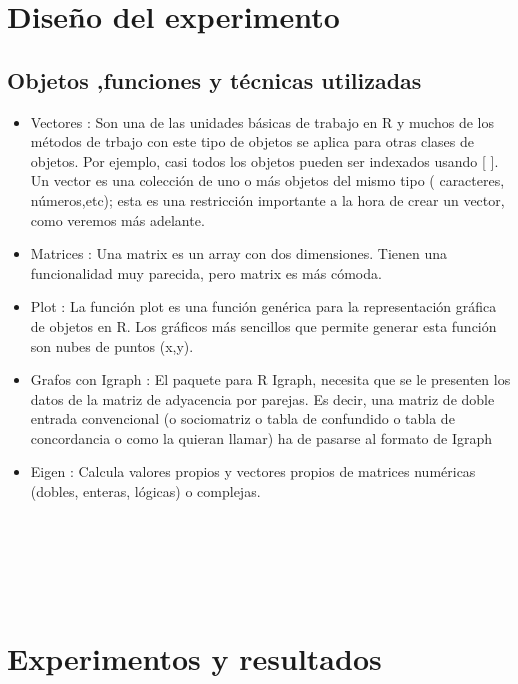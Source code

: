 \documentclass[twocolumn]{article}
\begin{document}
\section{Diseño del experimento}
\subsection{Objetos ,funciones y técnicas utilizadas}
\begin{itemize}
	\item
	Vectores : Son una de las unidades básicas de trabajo en R y muchos de los
métodos de trbajo con este tipo de objetos se aplica para otras clases de
objetos. Por ejemplo, casi todos los objetos pueden ser indexados usando [ ].
	Un vector es una colección de uno o más objetos del mismo tipo (
caracteres, números,etc); esta es una restricción importante a la hora de crear
un vector, como veremos más adelante.
	\item
	Matrices : Una matrix es un array con dos dimensiones. Tienen una
funcionalidad muy parecida, pero matrix es más cómoda.
	\item
    Plot  : La función plot es una función genérica para la representación gráfica de objetos en R. Los gráficos más sencillos que permite generar esta función son nubes de puntos (x,y).
    \item 
    Grafos con Igraph : El paquete para R Igraph, necesita que se le presenten los datos de la matriz de adyacencia por parejas. Es decir, una matriz de doble entrada convencional (o sociomatriz o tabla de confundido o tabla de concordancia o como la quieran llamar) ha de pasarse al formato de Igraph
    \item
    Eigen : Calcula valores propios y vectores propios de matrices numéricas (dobles, enteras, lógicas) o complejas.\\ \\ \\ \\ \\ \\
	\end{itemize}	
\section{Experimentos y resultados}
\end{document}
